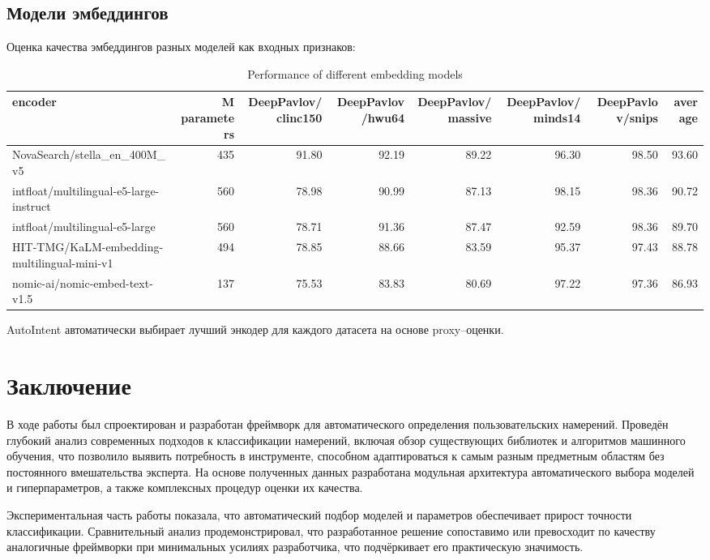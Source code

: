 \documentclass[14pt,a4paper,oneside,openany]{extbook}
\begin{document}
\section{Модели эмбеддингов}
\label{sec:org04e86a4}

Оценка качества эмбеддингов разных моделей как входных признаков:

\begin{table}[htbp]
\caption{\label{tab:embeddings}Performance of different embedding models}
\centering
\begin{tabular}{lrrrrrrr}
encoder & M parameters & DeepPavlov/clinc150 & DeepPavlov/hwu64 & DeepPavlov/massive & DeepPavlov/minds14 & DeepPavlov/snips & average\\
\hline
NovaSearch/stella\_en\_400M\_v5 & 435 & 91.80 & 92.19 & 89.22 & 96.30 & 98.50 & 93.60\\
intfloat/multilingual-e5-large-instruct & 560 & 78.98 & 90.99 & 87.13 & 98.15 & 98.36 & 90.72\\
intfloat/multilingual-e5-large & 560 & 78.71 & 91.36 & 87.47 & 92.59 & 98.36 & 89.70\\
HIT-TMG/KaLM-embedding-multilingual-mini-v1 & 494 & 78.85 & 88.66 & 83.59 & 95.37 & 97.43 & 88.78\\
nomic-ai/nomic-embed-text-v1.5 & 137 & 75.53 & 83.83 & 80.69 & 97.22 & 97.36 & 86.93\\
\end{tabular}
\end{table}

AutoIntent автоматически выбирает лучший энкодер для каждого датасета на основе proxy–оценки.
\chapter*{Заключение}
\label{sec:orgc073e8b}
В ходе работы был спроектирован и разработан фреймворк для автоматического определения пользовательских намерений. Проведён глубокий анализ современных подходов к классификации намерений, включая обзор существующих библиотек и алгоритмов машинного обучения, что позволило выявить потребность в инструменте, способном адаптироваться к самым разным предметным областям без постоянного вмешательства эксперта. На основе полученных данных разработана модульная архитектура автоматического выбора моделей и гиперпараметров, а также комплексных процедур оценки их качества.

Экспериментальная часть работы показала, что автоматический подбор моделей и параметров обеспечивает прирост точности классификации. Сравнительный анализ продемонстрировал, что разработанное решение сопоставимо или превосходит по качеству аналогичные фреймворки при минимальных усилиях разработчика, что подчёркивает его практическую значимость.

\printbibliography[title=СПИСОК\spaceИСПОЛЬЗОВАНЫХ\spaceИСТОЧНИКОВ]
\end{document}
